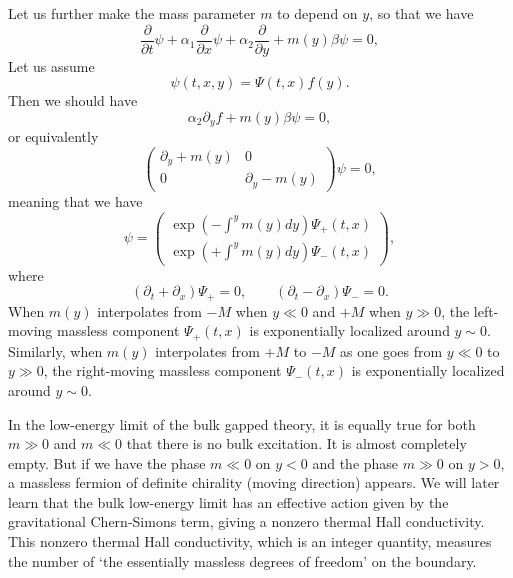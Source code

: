 \documentclass[12pt]{article}
\numberwithin{equation}{section}
\numberwithin{figure}{section}
\theoremstyle{remark}
\begin{document}
Let us further make the mass parameter $m$ to depend on $y$, so that we have \begin{equation}
\frac{\partial}{\partial t} \psi +\alpha_1 \frac{\partial} {\partial x}\psi   
+\alpha_2\frac{\partial}{\partial y} + m(y)\beta\psi=0,
\end{equation}
Let us assume \begin{equation}
\psi(t,x,y) = \Psi(t,x) f(y).
\end{equation} Then we should have  \begin{equation}
\alpha_2\partial_y f + m(y)\beta \psi =0,
\end{equation} or equivalently \begin{equation}
\begin{pmatrix}
\partial_y +m(y) & 0 \\
0 & \partial_y - m(y) 
\end{pmatrix} \psi =0, 
\end{equation} meaning that we have \begin{equation}
\psi = \begin{pmatrix}
\exp(-\int^y  m(y)  dy)  \Psi_+(t,x)\\
\exp(+\int^y  m(y)  dy) \Psi_-(t,x)
\end{pmatrix},
\end{equation}
where \begin{equation}
(\partial_t+\partial_x)\Psi_+=0,\qquad
(\partial_t-\partial_x)\Psi_-=0.
\end{equation}
When  $m(y)$ interpolates from $-M$ when $y \ll 0$ and $+M$ when $y\gg 0$,
the left-moving massless component $\Psi_+(t,x)$ is exponentially localized around $y\sim 0$.
Similarly, when $m(y)$ interpolates from $+M$ to $-M$ as one goes from $y\ll0$ to $y\gg 0$,
the right-moving massless component $\Psi_-(t,x)$ is exponentially localized around $y\sim 0$.

In the low-energy limit of the bulk gapped theory, it is equally true for both $m\gg 0 $
and $m\ll 0$ that there is no bulk excitation. It is almost completely empty.
But if we have the phase $m\ll 0$ on $y<0$ and the phase $m\gg 0$ on $y>0$,
a massless fermion of definite chirality (moving direction) appears.
We will later learn that the bulk low-energy limit has an effective action 
given by the gravitational Chern-Simons term, giving a nonzero thermal Hall conductivity.
This nonzero thermal Hall conductivity, which is an integer quantity,
measures the number of `the essentially massless degrees of freedom' on the boundary.
\end{document}
